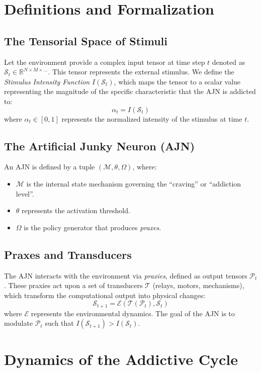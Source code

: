 \documentclass[12pt,a4paper]{article}
\begin{document}
\section{Definitions and Formalization}

\subsection{The Tensorial Space of Stimuli}
Let the environment provide a complex input tensor at time step $t$ denoted as $\mathcal{S}_t \in \mathbb{R}^{N \times M \times \dots}$. This tensor represents the external stimulus. We define the \textit{Stimulus Intensity Function} $I(\mathcal{S}_t)$, which maps the tensor to a scalar value representing the magnitude of the specific characteristic that the AJN is addicted to:
\[
\alpha_t = I(\mathcal{S}_t)
\]
where $\alpha_t \in [0, 1]$ represents the normalized intensity of the stimulus at time $t$.

\subsection{The Artificial Junky Neuron (AJN)}
An AJN is defined by a tuple $(\mathcal{M}, \theta, \Omega)$, where:
\begin{itemize}
    \item $\mathcal{M}$ is the internal state mechanism governing the ``craving'' or ``addiction level''.
    \item $\theta$ represents the activation threshold.
    \item $\Omega$ is the policy generator that produces \textit{praxes}.
\end{itemize}

\subsection{Praxes and Transducers}
The AJN interacts with the environment via \textit{praxies}, defined as output tensors $\mathcal{P}_t$. These praxies act upon a set of transducers $\mathcal{T}$ (relays, motors, mechanisms), which transform the computational output into physical changes:
\[
\mathcal{S}_{t+1} = \mathcal{E}(\mathcal{T}(\mathcal{P}_t), \mathcal{S}_t)
\]
where $\mathcal{E}$ represents the environmental dynamics. The goal of the AJN is to modulate $\mathcal{P}_t$ such that $I(\mathcal{S}_{t+1}) > I(\mathcal{S}_t)$.

\section{Dynamics of the Addictive Cycle}
\end{document}
